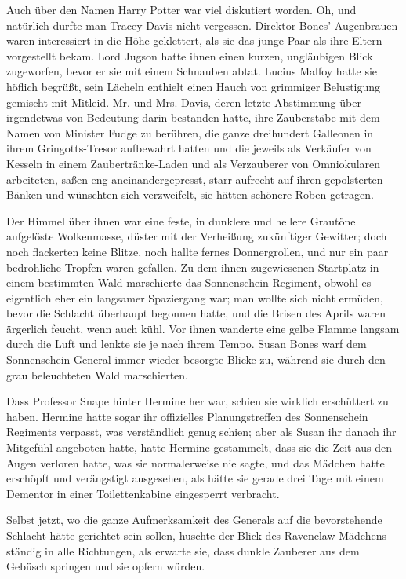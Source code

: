 {Auch über den Namen Harry Potter war viel diskutiert worden. Oh, und natürlich durfte man Tracey Davis nicht vergessen. Direktor Bones' Augenbrauen waren interessiert in die Höhe geklettert, als sie das junge Paar als ihre Eltern vorgestellt bekam. Lord Jugson hatte ihnen einen kurzen, ungläubigen Blick zugeworfen, bevor er sie mit einem Schnauben abtat. Lucius Malfoy hatte sie höflich begrüßt, sein Lächeln enthielt einen Hauch von grimmiger Belustigung gemischt mit Mitleid. Mr. und Mrs. Davis, deren letzte Abstimmung über irgendetwas von Bedeutung darin bestanden hatte, ihre Zauberstäbe mit dem Namen von Minister Fudge zu berühren, die ganze dreihundert Galleonen in ihrem Gringotts-Tresor aufbewahrt hatten und die jeweils als Verkäufer von Kesseln in einem Zaubertränke-Laden und als Verzauberer von Omniokularen arbeiteten, saßen eng aneinandergepresst, starr aufrecht auf ihren gepolsterten Bänken und wünschten sich verzweifelt, sie hätten schönere Roben getragen.

Der Himmel über ihnen war eine feste, in dunklere und hellere Grautöne aufgelöste Wolkenmasse, düster mit der Verheißung zukünftiger Gewitter; doch noch flackerten keine Blitze, noch hallte fernes Donnergrollen, und nur ein paar bedrohliche Tropfen waren gefallen. Zu dem ihnen zugewiesenen Startplatz in einem bestimmten Wald marschierte das Sonnenschein Regiment, obwohl es eigentlich eher ein langsamer Spaziergang war; man wollte sich nicht ermüden, bevor die Schlacht überhaupt begonnen hatte, und die Brisen des Aprils waren ärgerlich feucht, wenn auch kühl. Vor ihnen wanderte eine gelbe Flamme langsam durch die Luft und lenkte sie je nach ihrem Tempo. Susan Bones warf dem Sonnenschein-General immer wieder besorgte Blicke zu, während sie durch den grau beleuchteten Wald marschierten.

Dass Professor Snape hinter Hermine her war, schien sie wirklich erschüttert zu haben. Hermine hatte sogar ihr offizielles Planungstreffen des Sonnenschein Regiments verpasst, was verständlich genug schien; aber als Susan ihr danach ihr Mitgefühl angeboten hatte, hatte Hermine gestammelt, dass sie die Zeit aus den Augen verloren hatte, was sie normalerweise nie sagte, und das Mädchen hatte erschöpft und verängstigt ausgesehen, als hätte sie gerade drei Tage mit einem Dementor in einer Toilettenkabine eingesperrt verbracht.

Selbst jetzt, wo die ganze Aufmerksamkeit des Generals auf die bevorstehende Schlacht hätte gerichtet sein sollen, huschte der Blick des Ravenclaw-Mädchens ständig in alle Richtungen, als erwarte sie, dass dunkle Zauberer aus dem Gebüsch springen und sie opfern würden.

}

